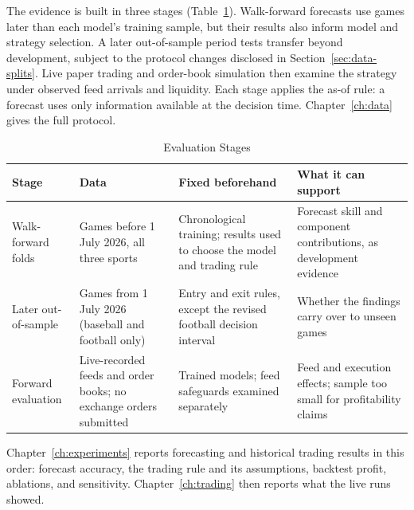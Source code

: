 \documentclass[12pt,a4paper,oneside]{report}
\begin{document}
The evidence is built in three stages (Table~\ref{tab:approach}). Walk-forward
forecasts use games later than each model's training sample, but their results
also inform model and strategy selection. A later out-of-sample period tests
transfer beyond development, subject to the protocol changes disclosed in
Section~\ref{sec:data-splits}. Live paper trading and order-book simulation
then examine the strategy under observed feed arrivals and liquidity. Each
stage applies the as-of rule: a forecast uses only information available at
the decision time. Chapter~\ref{ch:data} gives the full protocol.

\begin{table}[htbp]
\centering
\caption{Evaluation Stages}
\label{tab:approach}
\small
\begin{tabular}{@{}p{2.6cm}p{3.6cm}p{4.2cm}p{3.6cm}@{}}
\toprule
Stage & Data & Fixed beforehand & What it can support\\
\midrule
Walk-forward folds & Games before 1 July 2026, all three sports &
  Chronological training; results used to choose the model and trading rule &
  Forecast skill and component contributions, as development evidence\\
Later out-of-sample & Games from 1 July 2026 (baseball and football only) &
  Entry and exit rules, except the revised football decision interval &
  Whether the findings carry over to unseen games\\
Forward evaluation & Live-recorded feeds and order books; no exchange orders submitted &
  Trained models; feed safeguards examined separately &
  Feed and execution effects; sample too small for profitability claims\\
\bottomrule
\end{tabular}

\end{table}

Chapter~\ref{ch:experiments} reports forecasting and historical trading results
in this order: forecast accuracy, the trading rule and its assumptions, backtest
profit, ablations, and sensitivity. Chapter~\ref{ch:trading} then reports what the
live runs showed.
\end{document}
